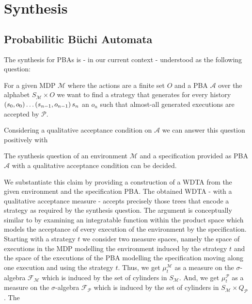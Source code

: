 \chapter{Synthesis}
\label{chapter:synthesis}
\section{Probabilitic Büchi Automata}
The synthesis for \acp{PBA} is - in our current context - understood as the
following question:
\begin{definition}
  For a given \ac{MDP} $\mathcal{M}$ where the actions are a finite set $O$ and
  a \ac{PBA} $\mathcal{A}$ over the alphabet $S_{\mathcal{M}}\times O$ we want
  to find a strategy that generates for every history
  $\left(s_{0}, o_{0}\right)\dots\left(s_{n-1},o_{n-1}\right)s_{n}$ an
  $o_{n}$ such that almost-all generated executions are accepted by
  $\mathcal{P}$.
  \label{def:synthesis}
\end{definition}
Considering a qualitative acceptance condition on $\mathcal{A}$ we can answer
this question positively with
\begin{theorem}
  The synthesis question of an environment $\mathcal{M}$ and a specification
  provided as \ac{PBA} $\mathcal{A}$ with a qualitative acceptance condition
  can be decided.
\end{theorem}
We substantiate this claim by providing a construction of a \ac{WDTA} from the
given environment and the specification \ac{PBA}. The obtained \ac{WDTA} - with
a qualitative acceptance measure - accepts precisely those trees that encode a
strategy as required by the synthesis question.
The argument is conceptually similar to \cite[Proposition 43]{RandAutoInfTrees}
by examining an integratable function within the product space which models
the acceptance of every execution of the environment by the specification.
Starting with a strategy $t$ we consider two measure spaces, namely the space
of executions in the \ac{MDP} modelling the environment induced by the strategy
$t$ and the space of the executions of the \ac{PBA} modelling the
specification moving along one execution and using the strategy $t$.
Thus, we get $\mu^{\mathcal{M}}_{t}$ as a measure on the $\sigma$-algebra
$\mathcal{F}_{\mathcal{M}}$ which is induced by the set of cylinders in
$S_{\mathcal{M}}$. And, we get $\mu^{\mathcal{P}}_{t}$ as a measure on the
$\sigma$-algebra $\mathcal{F}_{\mathcal{P}}$ which is induced
by the set of cylinders in $S_{\mathcal{M}}\times Q_{\mathcal{P}}$. The
